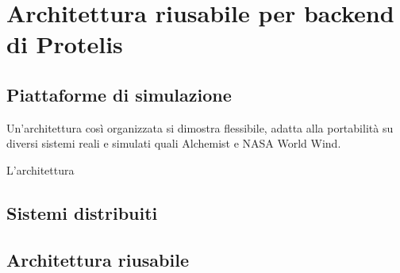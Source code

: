 \chapter{Architettura riusabile per backend di Protelis}
\section{Piattaforme di simulazione}
Un'architettura così organizzata si dimostra flessibile, adatta alla portabilità
su diversi sistemi reali\cite{Clark2015} e simulati quali
Alchemist\cite{alchemist} e NASA World Wind\cite{Bell2007}.

L'architettura

\section{Sistemi distribuiti}
\section{Architettura riusabile}
